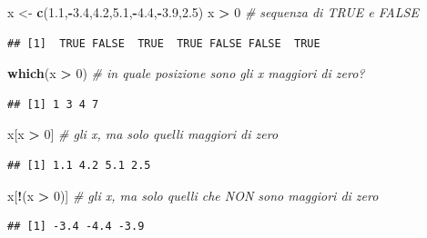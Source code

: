 \documentclass[
  11pt,
]{book}
\newenvironment{Shaded}{\begin{snugshade}}{\end{snugshade}}
\newcommand{\CommentTok}[1]{\textcolor[rgb]{0.56,0.35,0.01}{\textit{#1}}}
\newcommand{\DecValTok}[1]{\textcolor[rgb]{0.00,0.00,0.81}{#1}}
\newcommand{\FloatTok}[1]{\textcolor[rgb]{0.00,0.00,0.81}{#1}}
\newcommand{\FunctionTok}[1]{\textcolor[rgb]{0.13,0.29,0.53}{\textbf{#1}}}
\newcommand{\NormalTok}[1]{#1}
\newcommand{\OtherTok}[1]{\textcolor[rgb]{0.56,0.35,0.01}{#1}}
\newcommand{\SpecialCharTok}[1]{\textcolor[rgb]{0.81,0.36,0.00}{\textbf{#1}}}
\theoremstyle{mytheoremstyle}
\theoremstyle{mydefstyle}
\begin{document}
\begin{Shaded}
\begin{Highlighting}[]
\NormalTok{x }\OtherTok{\textless{}{-}} \FunctionTok{c}\NormalTok{(}\FloatTok{1.1}\NormalTok{,}\SpecialCharTok{{-}}\FloatTok{3.4}\NormalTok{,}\FloatTok{4.2}\NormalTok{,}\FloatTok{5.1}\NormalTok{,}\SpecialCharTok{{-}}\FloatTok{4.4}\NormalTok{,}\SpecialCharTok{{-}}\FloatTok{3.9}\NormalTok{,}\FloatTok{2.5}\NormalTok{)}
\NormalTok{x }\SpecialCharTok{\textgreater{}} \DecValTok{0} \CommentTok{\# sequenza di TRUE e FALSE}
\end{Highlighting}
\end{Shaded}

\begin{verbatim}
## [1]  TRUE FALSE  TRUE  TRUE FALSE FALSE  TRUE
\end{verbatim}

\begin{Shaded}
\begin{Highlighting}[]
\FunctionTok{which}\NormalTok{(x }\SpecialCharTok{\textgreater{}} \DecValTok{0}\NormalTok{) }\CommentTok{\# in quale posizione sono gli x maggiori di zero?}
\end{Highlighting}
\end{Shaded}

\begin{verbatim}
## [1] 1 3 4 7
\end{verbatim}

\begin{Shaded}
\begin{Highlighting}[]
\NormalTok{x[x }\SpecialCharTok{\textgreater{}} \DecValTok{0}\NormalTok{] }\CommentTok{\# gli x, ma solo quelli maggiori di zero}
\end{Highlighting}
\end{Shaded}

\begin{verbatim}
## [1] 1.1 4.2 5.1 2.5
\end{verbatim}

\begin{Shaded}
\begin{Highlighting}[]
\NormalTok{x[}\SpecialCharTok{!}\NormalTok{(x }\SpecialCharTok{\textgreater{}} \DecValTok{0}\NormalTok{)] }\CommentTok{\# gli x, ma solo quelli che NON sono maggiori di zero}
\end{Highlighting}
\end{Shaded}

\begin{verbatim}
## [1] -3.4 -4.4 -3.9
\end{verbatim}
\end{document}
